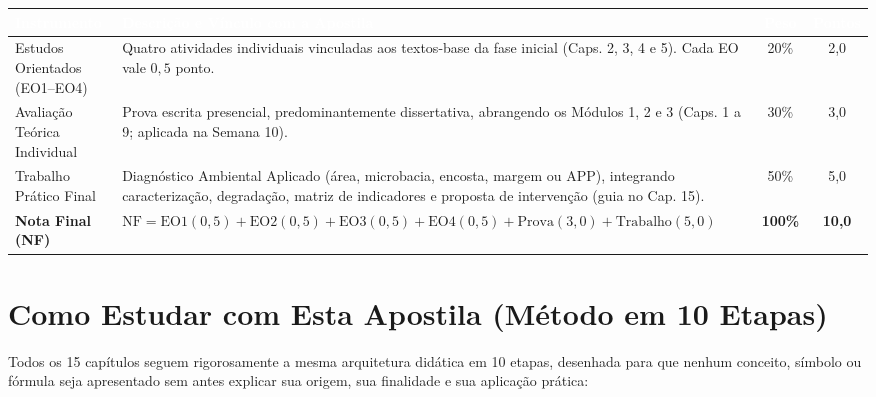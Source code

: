 \begin{center}
\renewcommand{\arraystretch}{1.25}
\begin{tabularx}{\textwidth}{@{}l >{\raggedright\arraybackslash}X c c@{}}
  \toprule
  \rowcolor{uefsNavy}
  \textcolor{white}{\bfseries Instrumento} & \textcolor{white}{\bfseries Descrição e Vínculo com a Apostila} & \textcolor{white}{\bfseries Peso} & \textcolor{white}{\bfseries Pontos} \\
  \midrule
  Estudos Orientados (EO1–EO4) & Quatro atividades individuais vinculadas aos textos-base da fase inicial (Caps. 2, 3, 4 e 5). Cada EO vale $0,5$ ponto. & 20\% & 2,0 \\
  \rowcolor{bgTeal}
  Avaliação Teórica Individual & Prova escrita presencial, predominantemente dissertativa, abrangendo os Módulos 1, 2 e 3 (Caps. 1 a 9; aplicada na Semana 10). & 30\% & 3,0 \\
  Trabalho Prático Final & Diagnóstico Ambiental Aplicado (área, microbacia, encosta, margem ou APP), integrando caracterização, degradação, matriz de indicadores e proposta de intervenção (guia no Cap. 15). & 50\% & 5,0 \\
  \midrule
  \textbf{Nota Final (NF)} & $\text{NF} = \text{EO1}(0,5) + \text{EO2}(0,5) + \text{EO3}(0,5) + \text{EO4}(0,5) + \text{Prova}(3,0) + \text{Trabalho}(5,0)$ & \textbf{100\%} & \textbf{10,0} \\
  \bottomrule
\end{tabularx}
\end{center}

\section*{Como Estudar com Esta Apostila (Método em 10 Etapas)}

Todos os 15 capítulos seguem rigorosamente a mesma arquitetura didática em 10 etapas, desenhada para que nenhum conceito, símbolo ou fórmula seja apresentado sem antes explicar sua origem, sua finalidade e sua aplicação prática:

